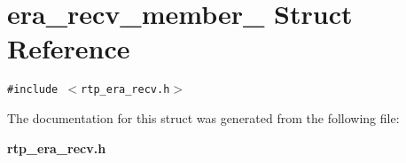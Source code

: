 \section{era\_\-recv\_\-member\_\- Struct Reference}
\label{structera__recv__member__}
{\tt \#include $<$rtp\_\-era\_\-recv.h$>$}



The documentation for this struct was generated from the following file:\begin{CompactItemize}
\item 
\bf{rtp\_\-era\_\-recv.h}\end{CompactItemize}
